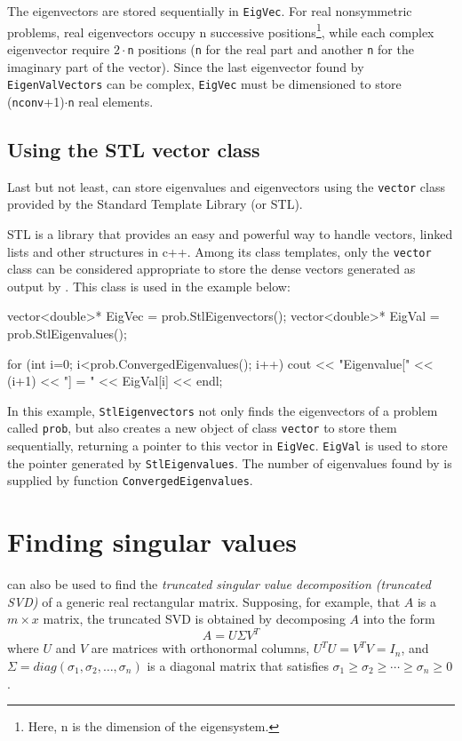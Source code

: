 The eigenvectors are stored sequentially in \texttt{EigVec}. For real nonsymmetric problems, real eigenvectors occupy n successive positions\footnote{Here, n is the dimension of the eigensystem.}, while each complex eigenvector require $2\cdot$\texttt{n} positions (\texttt{n} for the real part and another \texttt{n} for the imaginary part of the vector). Since the last eigenvector found by \texttt{EigenValVectors} can be complex, \texttt{EigVec} must be dimensioned to store (\texttt{nconv}+1)$\cdot$\texttt{n} real elements.

\subsection{Using the STL vector class}

Last but not least, \ARPP{} can store eigenvalues and eigenvectors using the \texttt{vector} class provided by the Standard Template Library (or STL).

STL is a library that provides an easy and powerful way to handle vectors, linked lists and other structures in c++. Among its class templates, only the \texttt{vector} class can be considered appropriate to store the dense vectors generated as output by \ARPP{}. This class is used in the example below:

\begin{cppcode}
vector<double>* EigVec = prob.StlEigenvectors();
vector<double>* EigVal = prob.StlEigenvalues();

for (int i=0; i<prob.ConvergedEigenvalues(); i++) {
	cout << "Eigenvalue[" << (i+1) << "] = " << EigVal[i] << endl;
}
\end{cppcode}

In this example, \texttt{StlEigenvectors} not only finds the eigenvectors of a problem called \texttt{prob}, but also creates a new object of class \texttt{vector} to store them sequentially, returning a pointer to this vector in \texttt{EigVec}. \texttt{EigVal} is used to store the pointer generated by \texttt{StlEigenvalues}. The number of eigenvalues found by \ARPP{} is supplied by function \texttt{ConvergedEigenvalues}. 

\section{Finding singular values}

\ARPP{} can also be used to find the \textit{truncated singular value decomposition (truncated SVD)} of a generic real rectangular matrix. Supposing, for example, that $A$ is a $m\times x$ matrix, the truncated SVD is obtained by decomposing $A$ into the form 
\[A=U\Sigma V^{T} \] 
where $U$ and $V$ are matrices with orthonormal columns, $U^{T} U=V^{T} V=I_{n}$, and $\Sigma =diag(\sigma_{1} ,\sigma_{2} ,\ldots ,\sigma_{n} )$ is a diagonal matrix that satisfies $\sigma_{1} \ge \sigma_{2} \ge \cdots \ge \sigma_{n} \ge 0$.

